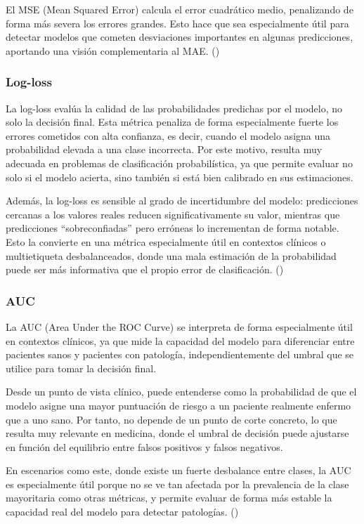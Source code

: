 \documentclass[12pt,a4paper,twoside]{book}
\begin{document}
El MSE (Mean Squared Error) calcula el error cuadrático medio, penalizando de forma más severa los errores grandes. 
Esto hace que sea especialmente útil para detectar modelos que cometen desviaciones importantes en algunas predicciones, aportando una visión complementaria al MAE. (\cite{chugh2020_regression_metrics})

\subsubsection*{Log-loss}

La log-loss evalúa la calidad de las probabilidades predichas por el modelo, no solo la decisión final. 
Esta métrica penaliza de forma especialmente fuerte los errores cometidos con alta confianza, es decir, cuando el modelo asigna una probabilidad elevada a una clase incorrecta. Por este motivo, resulta muy adecuada en problemas de clasificación probabilística, ya que permite evaluar no solo si el modelo acierta, sino también si está bien calibrado en sus estimaciones.

Además, la log-loss es sensible al grado de incertidumbre del modelo: predicciones cercanas a los valores reales reducen significativamente su valor, mientras que predicciones “sobreconfiadas” pero erróneas lo incrementan de forma notable. 
Esto la convierte en una métrica especialmente útil en contextos clínicos o multietiqueta desbalanceados, donde una mala estimación de la probabilidad puede ser más informativa que el propio error de clasificación. (\cite{koshurai2024_log_loss})

\subsubsection*{AUC}

La AUC (Area Under the ROC Curve) se interpreta de forma especialmente útil en contextos clínicos, ya que mide la capacidad del modelo para diferenciar entre pacientes sanos y pacientes con patología, independientemente del umbral que se utilice para tomar la decisión final.

Desde un punto de vista clínico, puede entenderse como la probabilidad de que el modelo asigne una mayor puntuación de riesgo a un paciente realmente enfermo que a uno sano. 
Por tanto, no depende de un punto de corte concreto, lo que resulta muy relevante en medicina, donde el umbral de decisión puede ajustarse en función del equilibrio entre falsos positivos y falsos negativos.

En escenarios como este, donde existe un fuerte desbalance entre clases, la AUC es especialmente útil porque no se ve tan afectada por la prevalencia de la clase mayoritaria como otras métricas, y permite evaluar de forma más estable la capacidad real del modelo para detectar patologías. (\cite{attal2026_roc_auc})
\end{document}
